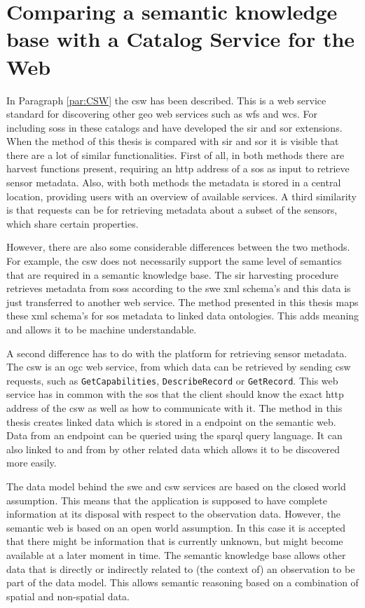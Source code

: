 \section{Comparing a semantic knowledge base with a Catalog Service for the Web}
In Paragraph \ref{par:CSW} the \acl{csw} has been described. This is a web service standard for discovering other geo web services such as \ac{wfs} and \ac{wcs}. For including \aclp{sos} in these catalogs \cite{SW:OGC3} and \cite{SW:OGC4} have developed the \ac{sir} and \ac{sor} extensions. When the method of this thesis is compared with \ac{sir} and \ac{sor} it is visible that there are a lot of similar functionalities. First of all, in both methods there are harvest functions present, requiring an \ac{http} address of a \ac{sos} as input to retrieve sensor metadata. Also, with both methods the metadata is stored in a central location, providing users with an overview of available services. A third similarity is that requests can be for retrieving metadata about a subset of the sensors, which share certain properties.  

However, there are also some considerable differences between the two methods. For example, the \ac{csw} does not necessarily support the same level of semantics that are required in a semantic knowledge base. The \ac{sir} harvesting procedure retrieves metadata from \aclp{sos} according to the \ac{swe} \ac{xml} schema's and this data is just transferred to another web service. The method presented in this thesis maps these \ac{xml} schema's for \ac{sos} metadata to linked data ontologies. This adds meaning and allows it to be machine understandable.

A second difference has to do with the platform for retrieving sensor metadata. The \ac{csw} is an \ac{ogc} web service, from which data can be retrieved by sending \ac{csw} requests, such as \texttt{GetCapabilities}, \texttt{DescribeRecord} or \texttt{GetRecord}. This web service has in common with the \ac{sos} that the client should know the exact \ac{http} address of the \ac{csw} as well as how to communicate with it. The method in this thesis creates linked data which is stored in a endpoint on the semantic web. Data from an endpoint can be queried using the \ac{sparql} query language. It can also linked to and from by other related data which allows it to be discovered more easily.    

The data model behind the \ac{swe} and \ac{csw} services are based on the closed world assumption. This means that the application is supposed to have complete information at its disposal with respect to the observation data. However, the semantic web is based on an open world assumption. In this case it is accepted that there might be information that is currently unknown, but might become available at a later moment in time. The semantic knowledge base allows other data that is directly or indirectly related to (the context of) an observation to be part of the data model. This allows semantic reasoning based on a combination of spatial and non-spatial data.       

